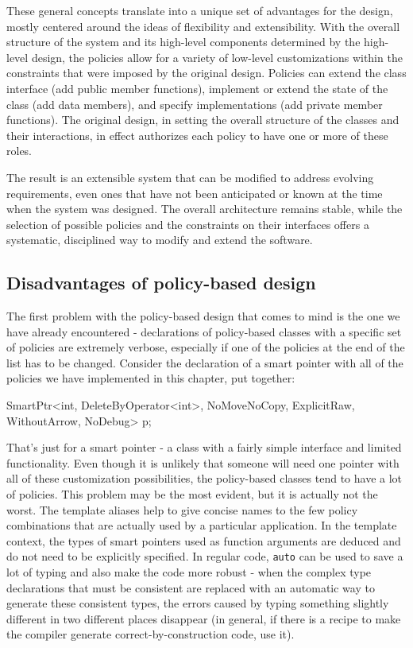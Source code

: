 These general concepts translate into a unique set of advantages for the design, mostly centered around the ideas of flexibility and extensibility. With the overall structure of the system and its high-level components determined by the high-level design, the policies allow for a variety of low-level customizations within the constraints that were imposed by the original design. Policies can extend the class interface (add public member functions), implement or extend the state of the class (add data members), and specify implementations (add private member functions). The original design, in setting the overall structure of the classes and their interactions, in effect authorizes each policy to have one or more of these roles.

The result is an extensible system that can be modified to address evolving requirements, even ones that have not been anticipated or known at the time when the system was designed. The overall architecture remains stable, while the selection of possible policies and the constraints on their interfaces offers a systematic, disciplined way to modify and extend the software.

\subsection{Disadvantages of policy-based design}

The first problem with the policy-based design that comes to mind is the one we have already encountered - declarations of policy-based classes with a specific set of policies are extremely verbose, especially if one of the policies at the end of the list has to be changed. Consider the declaration of a smart pointer with all of the policies we have implemented in this chapter, put together:

\begin{code}
SmartPtr<int, DeleteByOperator<int>, NoMoveNoCopy, ExplicitRaw, WithoutArrow, NoDebug> p;
\end{code}

That's just for a smart pointer - a class with a fairly simple interface and limited functionality. Even though it is unlikely that someone will need one pointer with all of these customization possibilities, the policy-based classes tend to have a lot of policies. This problem may be the most evident, but it is actually not the worst. The template aliases help to give concise names to the few policy combinations that are actually used by a particular application. In the template context, the types of smart pointers used as function arguments are deduced and do not need to be explicitly specified. In regular code, \texttt{auto} can be used to save a lot of typing and also make the code more robust - when the complex type declarations that must be consistent are replaced with an automatic way to generate these consistent types, the errors caused by typing something slightly different in two different places disappear (in general, if there is a recipe to make the compiler generate correct-by-construction code, use it).

